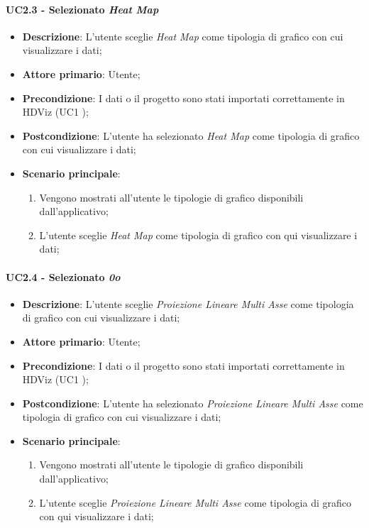 \paragraph{UC2.3 - Selezionato \emph{Heat Map}}
\label{ssub:uc2.3}

	\begin{itemize}
		\item \textbf{Descrizione}: L'utente sceglie \emph{Heat Map} come tipologia di grafico con cui visualizzare i dati;
		\item \textbf{Attore primario}: Utente;
		\item \textbf{Precondizione}: I dati o il progetto sono stati importati correttamente in HDViz (UC1 );
		\item \textbf{Postcondizione}: L'utente ha selezionato \emph{Heat Map} come tipologia di grafico con cui visualizzare i dati;
		\item \textbf{Scenario principale}:
			\begin{enumerate}
				\item Vengono mostrati all'utente le tipologie di grafico disponibili dall'applicativo;
				\item L'utente sceglie \emph{Heat Map} come tipologia di grafico con qui visualizzare i dati;
			\end{enumerate}
	\end{itemize}

\paragraph{UC2.4 - Selezionato \emph{0o}}
\label{ssub:uc2.4}

	\begin{itemize}
		\item \textbf{Descrizione}: L'utente sceglie \emph{Proiezione Lineare Multi Asse} come tipologia di grafico con cui visualizzare i dati;
		\item \textbf{Attore primario}: Utente;
		\item \textbf{Precondizione}: I dati o il progetto sono stati importati correttamente in HDViz (UC1 );
		\item \textbf{Postcondizione}: L'utente ha selezionato \emph{Proiezione Lineare Multi Asse} come tipologia di grafico con cui visualizzare i dati;
		\item \textbf{Scenario principale}:
			\begin{enumerate}
				\item Vengono mostrati all'utente le tipologie di grafico disponibili dall'applicativo;
				\item L'utente sceglie \emph{Proiezione Lineare Multi Asse} come tipologia di grafico con qui visualizzare i dati;
			\end{enumerate}
	\end{itemize}
